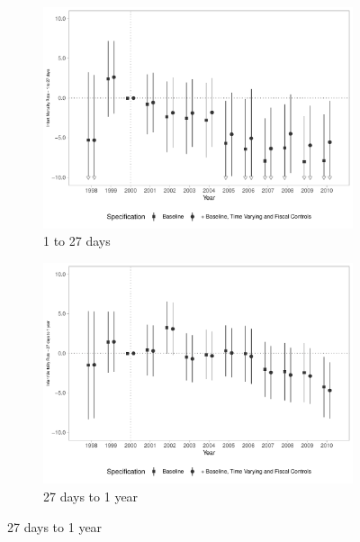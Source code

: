 \begin{figure}[h!]
\begin{center}
    \begin{subfigure}{0.48\textwidth}
        \centering
        \caption{\scriptsize 1 to 27 days}\label{fig:17c}
        \includegraphics[width=\textwidth]{plots/tx_mi_27d_dist_ec29_baseline_dist_ec29_baseline_17.pdf}
    \end{subfigure}
    \begin{subfigure}{0.48\textwidth}
        \centering
        \caption{\scriptsize 27 days to 1 year}\label{fig:17d}
        \includegraphics[width=\textwidth]{plots/tx_mi_ano_dist_ec29_baseline_dist_ec29_baseline_17.pdf}
    \end{subfigure}
    
    \end{center}
    
\end{figure}